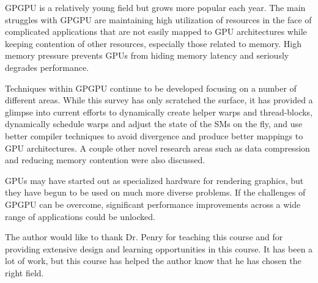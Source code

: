 \documentclass[prodmode,acmtecs]{acmsmall} %
\begin{document}
GPGPU is a relatively young field but grows more popular each year. The main
struggles with GPGPU are maintaining high utilization of resources in the face
of complicated applications that are not easily mapped to GPU architectures
while keeping contention of other resources, especially those related to memory.
High memory pressure prevents GPUs from hiding memory latency and seriously
degrades performance.

Techniques within GPGPU continue to be developed focusing on a number of
different areas. While this survey has only scratched the surface, it has
provided a glimpse into current efforts to dynamically create helper warps and
thread-blocks, dynamically schedule warps and adjust the state of the SMs on the
fly, and use better compiler techniques to avoid divergence and produce better
mappings to GPU architectures. A couple other novel research areas such as data
compression and reducing memory contention were also discussed.

GPUs may have started out as specialized hardware for rendering graphics, but
they have begun to be used on much more diverse problems. If the challenges of
GPGPU can be overcome, significant performance improvements across a wide range
of applications could be unlocked.

\begin{acks}
The author would like to thank Dr. Penry for teaching this course and for
providing extensive design and learning opportunities in this course. It has
been a lot of work, but this course has helped the author know that he has
chosen the right field.
\end{acks}




\end{document}
